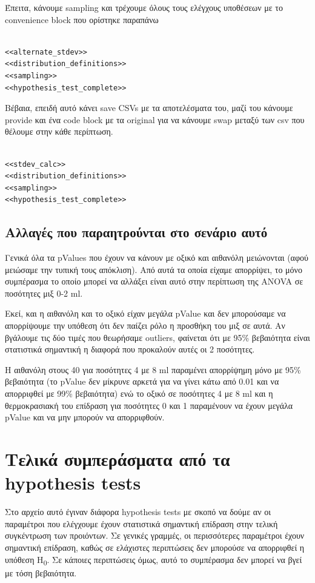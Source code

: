 \documentclass[11pt]{article}
\begin{document}
Έπειτα, κάνουμε sampling και τρέχουμε όλους τους ελέγχους υποθέσεων με το convenience block που ορίστηκε παραπάνω

\begin{verbatim}

<<alternate_stdev>>
<<distribution_definitions>>
<<sampling>>
<<hypothesis_test_complete>>

\end{verbatim}

Βέβαια, επειδή αυτό κάνει save CSVs με τα αποτελέσματα του, μαζί του κάνουμε provide και ένα code block με τα original για να κάνουμε swap μεταξύ των csv που θέλουμε στην κάθε περίπτωση.

\begin{verbatim}

<<stdev_calc>>
<<distribution_definitions>>
<<sampling>>
<<hypothesis_test_complete>>

\end{verbatim}

\subsection{Αλλαγές που παραητρούνται στο σενάριο αυτό}
\label{sec:org2efec78}
Γενικά όλα τα pValues που έχουν να κάνουν με οξικό και αιθανόλη μειώνονται (αφού μειώσαμε την τυπική τους απόκλιση). Από αυτά τα οποία είχαμε απορρίψει, το μόνο συμπέρασμα το οποίο μπορεί να αλλάξει είναι αυτό στην περίπτωση της ANOVA σε ποσότητες μιξ 0-2 ml.

Εκεί, και η αιθανόλη και το οξικό είχαν μεγάλα pValue και δεν μπορούσαμε να απορρίψουμε την υπόθεση ότι δεν παίζει ρόλο η προσθήκη του μιξ σε αυτά. Αν βγάλουμε τις δύο τιμές που θεωρήσαμε outliers, φαίνεται ότι με 95\% βεβαιότητα είναι στατιστικά σημαντική η διαφορά που προκαλούν αυτές οι 2 ποσότητες.

Η αιθανόλη στους 40 για ποσότητες 4 με 8 ml παραμένει απορρίψημη μόνο με 95\% βεβαιότητα (το pValue δεν μίκρυνε αρκετά για να γίνει κάτω από 0.01 και να απορριφθεί με 99\% βεβαιότητα) ενώ το οξικό σε ποσότητες 4 με 8 ml και η θερμοκρασιακή του επίδραση για ποσότητες 0 και 1 παραμένουν να έχουν μεγάλα pValue και να μην μπορούν να απορριφθούν.

\section{Τελικά συμπεράσματα από τα hypothesis tests}
\label{sec:org9e56826}
Στο αρχείο αυτό έγιναν διάφορα hypothesis tests με σκοπό να δούμε αν οι παραμέτροι που ελέγχουμε έχουν στατιστικά σημαντική επίδραση στην τελική συγκέντρωση των προιόντων. Σε γενικές γραμμές, οι περισσότερες παραμέτροι έχουν σημαντική επίδραση, καθώς σε ελάχιστες περιπτώσεις δεν μπορούσε να απορριφθεί η υπόθεση H\textsubscript{0}. Σε κάποιες περιπτώσεις όμως, αυτό το συμπέρασμα δεν μπορεί να βγεί με τόση βεβαιότητα.
\end{document}
